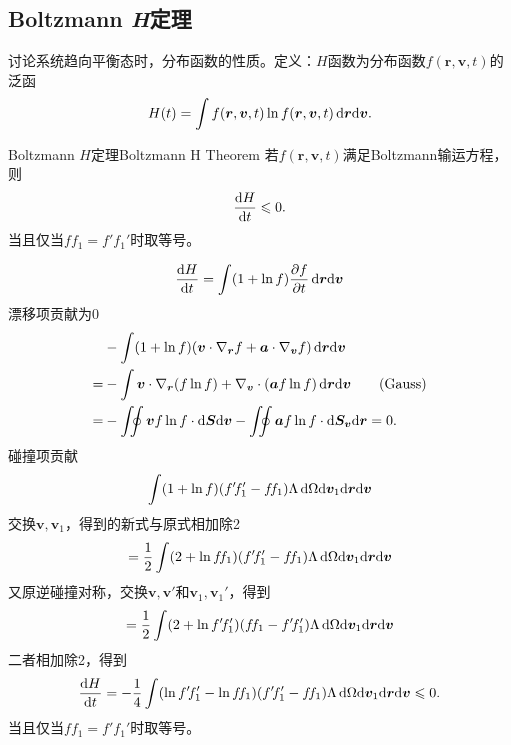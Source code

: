 \subsection{Boltzmann \textit{H}定理}
讨论系统趋向平衡态时，分布函数的性质。定义：$H$函数为分布函数$f(\bm r,\bm v,t)$的泛函
\begin{align}
	H(t)=\int f(\bm r,\bm v,t)\ln f(\bm r,\bm v,t)\mathop{}\!\mathrm{d}\bm r\mathrm{d}\bm v.
\end{align}
\begin{theorem}{Boltzmann $H$定理}{Boltzmann H Theorem}
	若$f(\bm r,\bm v,t)$满足Boltzmann输运方程，则
	\begin{align}
		\frac{\mathrm{d}^{\;\!\!}H}{\mathrm{d} t^{\;\!\!}}\leqslant 0.
	\end{align}
	当且仅当$f\!f_1=f'\!f_1'$时取等号。
\end{theorem}
\prf 
\begin{align*}
	\dv Ht=\int(1+\ln f)\pv ft\d\bm r\nd\bm v
\end{align*}
漂移项贡献为0
\begin{align*}
	&-\int(1+\ln f)(\bm v\cdot\nabla_{\bm r}f+\bm a\cdot\nabla_{\bm v}f)\d\bm r\nd\bm v\\
	=&-\int\bm v\cdot\nabla_{\bm r}(f\ln f)+\nabla_{\bm v}\cdot(\bm af\ln f)\d\bm r\nd\bm v\tag{Gauss}\\
	=&-\int\bs5\oint \bm v f\ln f\cdot\d\bm S\nd\bm v-\int\bs5\oint\bm af\ln f\cdot\d\bm S_{\bm v}\nd\bm r=0.
\end{align*}
碰撞项贡献
\begin{align*}
	\int (1+\ln f)(f'\!f_1'-f\!f_1)\Lambda\mathop{}\!\mathrm{d}\Omega\mathrm{d}\bm v_1\mathrm{d}\bm r\mathrm{d}\bm v
\end{align*}
交换$\bm v,\bm v_1$，得到的新式与原式相加除2
\[
	=\frac12\int (2+\ln f\!f_1)(f'\!f_1'-f\!f_1)\Lambda\mathop{}\!\mathrm{d}\Omega\mathrm{d}\bm v_1\mathrm{d}\bm r\mathrm{d}\bm v
\]
又原逆碰撞对称，交换$\bm v,\bm v'$和$\bm v_1,\bm v_1'$，得到
\[
	=\frac12\int (2+\ln f'\!f_1')(f\!f_1-f'\!f_1')\Lambda\mathop{}\!\mathrm{d}\Omega\mathrm{d}\bm v_1\mathrm{d}\bm r\mathrm{d}\bm v
\]
二者相加除2，得到
\begin{align}
	\dv Ht=-\frac14\int (\ln f'\!f_1'-\ln f\!f_1)(f'\!f_1'-f\!f_1)\Lambda\d\Omega\nd\bm v_1\nd\bm r\nd\bm v\leqslant 0.
\end{align}
当且仅当$f\!f_1=f'\!f_1'$时取等号。

